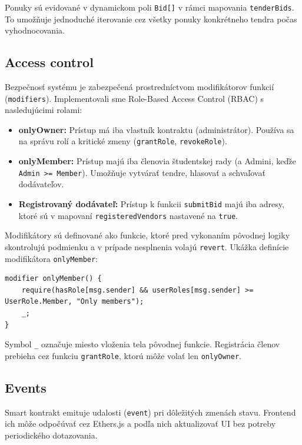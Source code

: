 Ponuky sú evidované v dynamickom poli \texttt{Bid[]} v rámci mapovania \texttt{tenderBids}. To umožňuje jednoduché iterovanie cez všetky ponuky konkrétneho tendra počas vyhodnocovania.

\subsection{Access control}

Bezpečnosť systému je zabezpečená prostredníctvom modifikátorov funkcií (\texttt{modifiers}). Implementovali sme Role-Based Access Control (RBAC) s nasledujúcimi rolami:

\begin{itemize}
    \item \textbf{onlyOwner:} Prístup má iba vlastník kontraktu (administrátor). Používa sa na správu rolí a kritické zmeny (\texttt{grantRole}, \texttt{revokeRole}).
    \item \textbf{onlyMember:} Prístup majú iba členovia študentskej rady (a Admini, keďže \texttt{Admin >= Member}). Umožňuje vytvárať tendre, hlasovať a schvaľovať dodávateľov.
    \item \textbf{Registrovaný dodávateľ:} Prístup k funkcii \texttt{submitBid} majú iba adresy, ktoré sú v mapovaní \texttt{registeredVendors} nastavené na \texttt{true}.
\end{itemize}

Modifikátory sú definované ako funkcie, ktoré pred vykonaním pôvodnej logiky skontrolujú podmienku a v prípade nesplnenia volajú \texttt{revert}. Ukážka definície modifikátora \texttt{onlyMember}:

\begin{lstlisting}[language=Solidity, caption={Modifikátor onlyMember pre prístup členov rady}, label={lst:modifier-member}]
modifier onlyMember() {
    require(hasRole[msg.sender] && userRoles[msg.sender] >= UserRole.Member, "Only members");
    _;
}
\end{lstlisting}

Symbol \texttt{\_} označuje miesto vloženia tela pôvodnej funkcie. Registrácia členov prebieha cez funkciu \texttt{grantRole}, ktorú môže volať len \texttt{onlyOwner}.

\subsection{Events}

Smart kontrakt emituje udalosti (\texttt{event}) pri dôležitých zmenách stavu. Frontend ich môže odpočúvať cez Ethers.js a podľa nich aktualizovať UI bez potreby periodického dotazovania.

